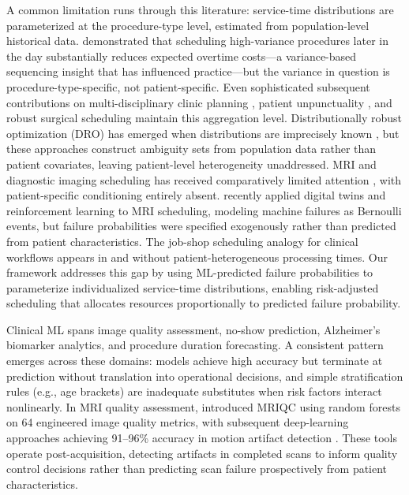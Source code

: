 \documentclass[11pt,a4paper]{article}
\begin{document}
A common limitation runs through this literature: service-time distributions are parameterized at the procedure-type level, estimated from population-level historical data. \citet{denton2007optimization} demonstrated that scheduling high-variance procedures later in the day substantially reduces expected overtime costs---a variance-based sequencing insight that has influenced practice---but the variance in question is procedure-type-specific, not patient-specific. Even sophisticated subsequent contributions on multi-disciplinary clinic planning \citep{leeftink2019stochastic}, patient unpunctuality \citep{jiang2019stochastic}, and robust surgical scheduling \citep{neyshabouri2017two} maintain this aggregation level. Distributionally robust optimization (DRO) has emerged when distributions are imprecisely known \citep{jiang2017integer, shehadeh2021distributionally}, but these approaches construct ambiguity sets from population data rather than patient covariates, leaving patient-level heterogeneity unaddressed. MRI and diagnostic imaging scheduling has received comparatively limited attention \citep{qiu2019mri, sun2021stochastic, bouguerra2023integrating}, with patient-specific conditioning entirely absent. \citet{silvaaravena2025mri} recently applied digital twins and reinforcement learning to MRI scheduling, modeling machine failures as Bernoulli events, but failure probabilities were specified exogenously rather than predicted from patient characteristics. The job-shop scheduling analogy for clinical workflows appears in \citet{burdett2018flexible} and \citet{pham2008surgical} without patient-heterogeneous processing times. Our framework addresses this gap by using ML-predicted failure probabilities to parameterize individualized service-time distributions, enabling risk-adjusted scheduling that allocates resources proportionally to predicted failure probability.


Clinical ML spans image quality assessment, no-show prediction, Alzheimer's biomarker analytics, and procedure duration forecasting. A consistent pattern emerges across these domains: models achieve high accuracy but terminate at prediction without translation into operational decisions, and simple stratification rules (e.g., age brackets) are inadequate substitutes when risk factors interact nonlinearly. In MRI quality assessment, \citet{esteban2017mriqc} introduced MRIQC using random forests on 64 engineered image quality metrics, with subsequent deep-learning approaches achieving 91--96\% accuracy in motion artifact detection \citep{vakli2023automatic, beljaards2024motion}. These tools operate post-acquisition, detecting artifacts in completed scans to inform quality control decisions rather than predicting scan failure prospectively from patient characteristics.
\end{document}
